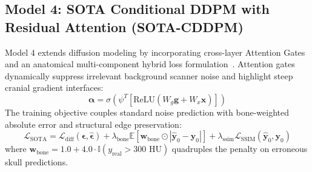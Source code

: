 \subsection{Model 4: SOTA Conditional DDPM with Residual Attention (SOTA-CDDPM)}
Model 4 extends diffusion modeling by incorporating cross-layer Attention Gates and an anatomical multi-component hybrid loss formulation~\cite{kazerouni2023diffusion,lyu2022conversion}. Attention gates dynamically suppress irrelevant background scanner noise and highlight steep cranial gradient interfaces:
\begin{equation}
\mathbf{\alpha} = \sigma\left( \psi^T \left[ \text{ReLU}\left( W_g \mathbf{g} + W_x \mathbf{x} \right) \right] \right)
\label{eq:m4_attention}
\end{equation}
The training objective couples standard noise prediction with bone-weighted absolute error and structural edge preservation:
\begin{equation}
\mathcal{L}_{\text{SOTA}} = \mathcal{L}_{\text{diff}}(\boldsymbol{\epsilon}, \hat{\boldsymbol{\epsilon}}) + \lambda_{\text{bone}} \mathbb{E}\left[ \mathbf{w}_{\text{bone}} \odot |\hat{\mathbf{y}}_0 - \mathbf{y}_0| \right] + \lambda_{\text{ssim}} \mathcal{L}_{\text{SSIM}}(\hat{\mathbf{y}}_0, \mathbf{y}_0)
\label{eq:m4_hybrid_loss}
\end{equation}
where $\mathbf{w}_{\text{bone}} = 1.0 + 4.0 \cdot \mathbb{I}(y_{\text{real}} > 300\text{ HU})$ quadruples the penalty on erroneous skull predictions.

